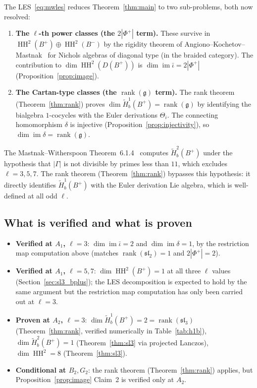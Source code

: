 \documentclass[11pt,letterpaper]{amsart}
\theoremstyle{plain}
\theoremstyle{definition}
\theoremstyle{remark}
\newcommand{\HH}{\operatorname{HH}}
\begin{document}
The LES~\eqref{eq:mwles} reduces Theorem~\ref{thm:main} to two sub-problems, both now resolved:
\begin{enumerate}
\item \textbf{The $\ell$-th power classes (the $2|\Phi^+|$ term).} These survive in $\HH^2(B^+) \oplus \HH^2(B^-)$ by the rigidity theorem of Angiono--Kochetov--Mastnak~\cite{AKM15} for Nichols algebras of diagonal type (in the braided category). The contribution to $\dim \HH^2(D(B^+))$ is $\dim \operatorname{im} \bar\iota = 2|\Phi^+|$ (Proposition~\ref{prop:image}).
\item \textbf{The Cartan-type classes (the $\operatorname{rank}(\mathfrak{g})$ term).} The rank theorem (Theorem~\ref{thm:rank}) proves $\dim \tilde{H}^1_b(B^+) = \operatorname{rank}(\mathfrak{g})$ by identifying the bialgebra $1$-cocycles with the Euler derivations $\Theta_i$. The connecting homomorphism $\delta$ is injective (Proposition~\ref{prop:injectivity}), so $\dim \operatorname{im} \delta = \operatorname{rank}(\mathfrak{g})$.
\end{enumerate}

The Mastnak--Witherspoon Theorem~6.1.4~\cite{MW08} computes $\tilde{H}^2_b(B^+)$ under the hypothesis that $|\Gamma|$ is not divisible by primes less than $11$, which excludes $\ell = 3, 5, 7$. The rank theorem (Theorem~\ref{thm:rank}) bypasses this hypothesis: it directly identifies $\tilde{H}^1_b(B^+)$ with the Euler derivation Lie algebra, which is well-defined at all odd $\ell$.

\subsection{What is verified and what is proven}

\begin{itemize}
\item \textbf{Verified at $A_1$, $\ell = 3$}: $\dim \operatorname{im} \bar\iota = 2$ and $\dim \operatorname{im} \delta = 1$, by the restriction map computation above (matches $\operatorname{rank}(\mathfrak{sl}_2) = 1$ and $2|\Phi^+| = 2$).
\item \textbf{Verified at $A_1$, $\ell = 5, 7$}: $\dim \HH^2(B^+) = 1$ at all three $\ell$ values (Section~\ref{sec:sl3_bplus}); the LES decomposition is expected to hold by the same argument but the restriction map computation has only been carried out at $\ell = 3$.
\item \textbf{Proven at $A_2$, $\ell = 3$}: $\dim \tilde{H}^1_b(B^+) = 2 = \operatorname{rank}(\mathfrak{sl}_3)$ (Theorem~\ref{thm:rank}, verified numerically in Table~\ref{tab:h1b}), $\dim \tilde{H}^2_b(B^+) = 1$ (Theorem~\ref{thm:sl3} via projected Lanczos), $\dim \HH^2 = 8$ (Theorem~\ref{thm:sl3}).
\item \textbf{Conditional at $B_2, G_2$}: the rank theorem (Theorem~\ref{thm:rank}) applies, but Proposition~\ref{prop:image} Claim~2 is verified only at $A_2$.
\end{itemize}
\end{document}
